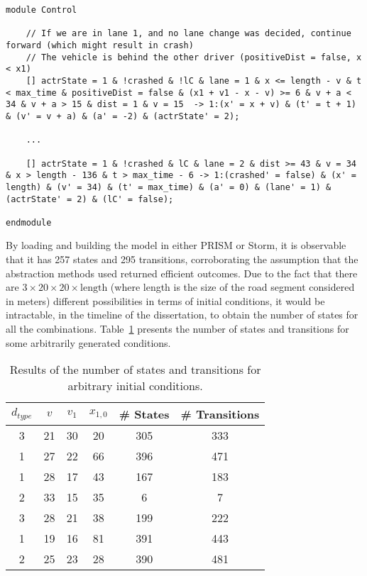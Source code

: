 {\begin{lstlisting}[caption={Example of the model generated for the tuple $(d_{type}, v, v_1, x_{1,0}) = (1,30,22,51)$ (shortned)},captionpos=b,label={lst:model_example}]
module Control

 	// If we are in lane 1, and no lane change was decided, continue forward (which might result in crash)
 	// The vehicle is behind the other driver (positiveDist = false, x < x1)
	[] actrState = 1 & !crashed & !lC & lane = 1 & x <= length - v & t < max_time & positiveDist = false & (x1 + v1 - x - v) >= 6 & v + a < 34 & v + a > 15 & dist = 1 & v = 15  -> 1:(x' = x + v) & (t' = t + 1) & (v' = v + a) & (a' = -2) & (actrState' = 2);

	...

	[] actrState = 1 & !crashed & lC & lane = 2 & dist >= 43 & v = 34 & x > length - 136 & t > max_time - 6 -> 1:(crashed' = false) & (x' = length) & (v' = 34) & (t' = max_time) & (a' = 0) & (lane' = 1) & (actrState' = 2) & (lC' = false);

endmodule
\end{lstlisting}
}

By loading and building the model in either PRISM or Storm, it is observable that it has 257 states and 295 transitions, corroborating the assumption that the abstraction methods used returned efficient outcomes. Due to the fact that there are $3\times 20 \times 20 \times \text{length}$ (where length is the size of the road segment considered in meters) different possibilities in terms of initial conditions, it would be intractable, in the timeline of the dissertation, to obtain the number of states for all the combinations. Table~\ref{tab:sta_tra_example} presents the number of states and transitions for some arbitrarily generated conditions.

\bgroup
\def\arraystretch{1.3}
\begin{table}[h]
\centering
\begin{tabular}{|c|c|c|c||c|c|}
\hline
\textbf{$d_{type}$} & \textbf{$v$} & \textbf{$v_1$} & \textbf{$x_{1,0}$} & \textbf{\# States} & \textbf{\# Transitions} \\ \hline \hline
3 & 21 & 30 & 20 & 305 & 333 \\ \hline
1 & 27 & 22 & 66 & 396 & 471 \\ \hline
1 & 28 & 17 & 43 & 167 & 183 \\ \hline
2 & 33 & 15 & 35 & 6 & 7 \\ \hline
3 & 28 & 21 & 38 & 199 & 222 \\ \hline
1 & 19 & 16 & 81 & 391 & 443 \\ \hline
2 & 25 & 23 & 28 & 390 & 481 \\ \hline
\end{tabular}
\caption{Results of the number of states and transitions for arbitrary initial conditions.}
\label{tab:sta_tra_example}
\end{table}
\egroup

